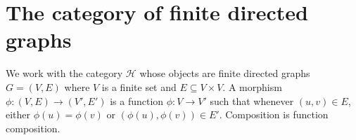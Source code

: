 \section{The category of finite directed graphs}
We work with the category \(\mathcal{H}\) whose objects are finite directed graphs \(G = (V,E)\) where \(V\) is a finite set and \(E \subseteq V \times V\).
A morphism \(\phi : (V,E) \to (V',E')\) is a function \(\phi : V \to V'\) such that whenever \((u,v) \in E\), either \(\phi(u) = \phi(v)\) or \((\phi(u),\phi(v)) \in E'\).
Composition is function composition.